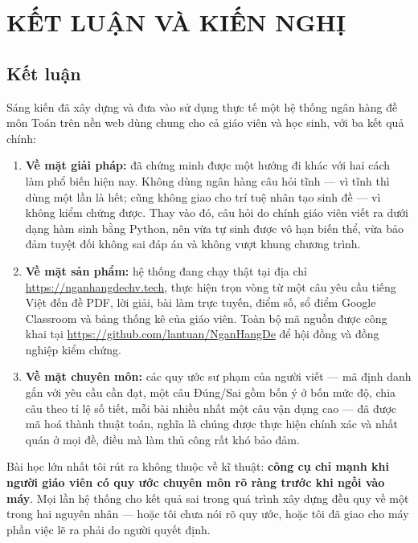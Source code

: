 \section{KẾT LUẬN VÀ KIẾN NGHỊ}

\subsection{Kết luận}

Sáng kiến đã xây dựng và đưa vào sử dụng thực tế một hệ thống ngân hàng đề môn
Toán trên nền web dùng chung cho cả giáo viên và học sinh, với ba kết quả
chính:

\begin{enumerate}[label=(\arabic*), leftmargin=1.2cm, itemsep=3pt]
  \item \textbf{Về mặt giải pháp:} đã chứng minh được một hướng đi khác với hai
        cách làm phổ biến hiện nay. Không dùng ngân hàng câu hỏi tĩnh --- vì
        tĩnh thì dùng một lần là hết; cũng không giao cho trí tuệ nhân tạo sinh
        đề --- vì không kiểm chứng được. Thay vào đó, câu hỏi do chính giáo
        viên viết ra dưới dạng hàm sinh bằng Python, nên vừa tự sinh được vô
        hạn biến thể, vừa bảo đảm tuyệt đối không sai đáp án và không vượt
        khung chương trình.
  \item \textbf{Về mặt sản phẩm:} hệ thống đang chạy thật tại địa chỉ
        \url{https://nganhangdechv.tech}, thực hiện trọn vòng từ một câu yêu
        cầu tiếng Việt đến đề PDF, lời giải, bài làm trực tuyến, điểm số, sổ
        điểm Google Classroom và bảng thống kê của giáo viên. Toàn bộ mã nguồn
        được công khai tại \url{https://github.com/lantuan/NganHangDe} để hội
        đồng và đồng nghiệp kiểm chứng.
  \item \textbf{Về mặt chuyên môn:} các quy ước sư phạm của người viết --- mã
        định danh gắn với yêu cầu cần đạt, một câu Đúng/Sai gồm bốn ý ở bốn mức
        độ, chia câu theo tỉ lệ số tiết, mỗi bài nhiều nhất một câu vận dụng
        cao --- đã được mã hoá thành thuật toán, nghĩa là chúng được thực hiện
        chính xác và nhất quán ở mọi đề, điều mà làm thủ công rất khó bảo đảm.
\end{enumerate}

Bài học lớn nhất tôi rút ra không thuộc về kĩ thuật: \textbf{công cụ chỉ mạnh
khi người giáo viên có quy ước chuyên môn rõ ràng trước khi ngồi vào máy}. Mọi
lần hệ thống cho kết quả sai trong quá trình xây dựng đều quy về một trong hai
nguyên nhân --- hoặc tôi chưa nói rõ quy ước, hoặc tôi đã giao cho máy phần
việc lẽ ra phải do người quyết định.


